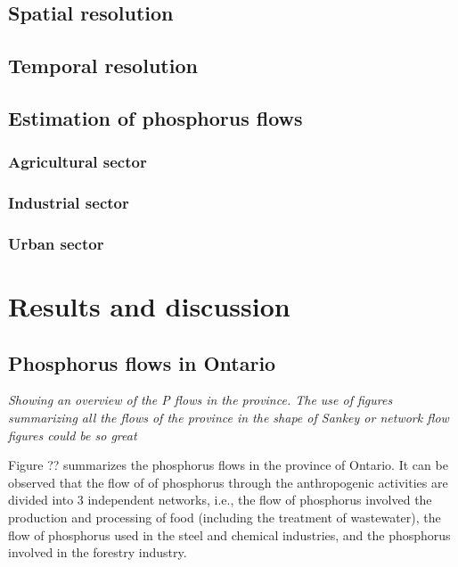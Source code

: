 \documentclass[authoryear]{elsarticle}
\begin{document}
\subsection{Spatial resolution}

\subsection{Temporal resolution}

\subsection{Estimation of phosphorus flows}

\subsubsection{Agricultural sector}

\subsubsection{Industrial sector}

\subsubsection{Urban sector}

\section{Results and discussion}
\subsection{Phosphorus flows in Ontario}
\emph{\color{red}Showing an overview of the P flows in the province. The use of figures summarizing all the flows of the province in the shape of Sankey or network flow figures could be so great}

Figure ?? summarizes the phosphorus flows in the province of Ontario. It can be observed that the flow of of phosphorus through the anthropogenic activities are divided into 3 independent networks, i.e., the flow of phosphorus involved the production and processing of food (including the treatment of wastewater), the flow of phosphorus used in the steel and chemical industries, and the phosphorus involved in the forestry industry.
\end{document}
